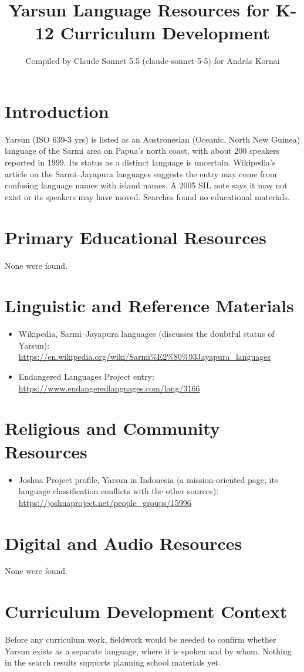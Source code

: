 \documentclass[12pt]{article}
\title{Yarsun Language Resources for K-12 Curriculum Development}
\author{Compiled by Claude Sonnet 5.5 (claude-sonnet-5-5) for Andr\'as Kornai}
\date{}
\begin{document}
\maketitle

\section{Introduction}
Yarsun (ISO 639-3 yrs) is listed as an Austronesian (Oceanic, North New Guinea) language of the Sarmi area on Papua's north coast, with about 200 speakers reported in 1999. Its status as a distinct language is uncertain. Wikipedia's article on the Sarmi--Jayapura languages suggests the entry may come from confusing language names with island names. A 2005 SIL note says it may not exist or its speakers may have moved. Searches found no educational materials.

\section{Primary Educational Resources}
None were found.

\section{Linguistic and Reference Materials}
\begin{itemize}
\item Wikipedia, Sarmi--Jayapura languages (discusses the doubtful status of Yarsun): \url{https://en.wikipedia.org/wiki/Sarmi%E2%80%93Jayapura_languages}
\item Endangered Languages Project entry: \url{https://www.endangeredlanguages.com/lang/3166}
\end{itemize}

\section{Religious and Community Resources}
\begin{itemize}
\item Joshua Project profile, Yarsun in Indonesia (a mission-oriented page; its language classification conflicts with the other sources): \url{https://joshuaproject.net/people_groups/15996}
\end{itemize}

\section{Digital and Audio Resources}
None were found.

\section{Curriculum Development Context}
Before any curriculum work, fieldwork would be needed to confirm whether Yarsun exists as a separate language, where it is spoken and by whom. Nothing in the search results supports planning school materials yet.
\end{document}
